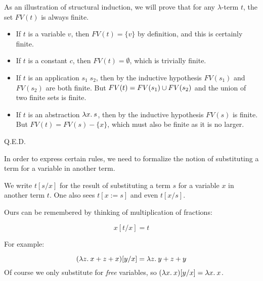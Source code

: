 \begin{slide*}


\vspace*{0.5cm}

As an illustration of structural induction, we will prove that for any
$\lambda$-term {\red $t$}, the set {\red $FV(t)$} is always finite.

\begin{itemize}

\item If {\red $t$} is a variable {\red $v$}, then {\red $FV(t) = \{v\}$} by
definition, and this is certainly finite.

\item If {\red $t$} is a constant {\red $c$}, then {\red $FV(t) = \emptyset$},
which is trivially finite.

\item If {\red $t$} is an application {\red $s_1\; s_2$}, then by the inductive
hypothesis {\red $FV(s_1)$} and {\red $FV(s_2)$} are both finite. But {\red
$FV(t) = FV(s_1) \cup FV(s_2)$} and the union of two finite sets is finite.

\item If {\red $t$} is an abstraction {\red $\lambda x.\: s$}, then by the
inductive hypothesis {\red $FV(s)$} is finite. But {\red $FV(t) = FV(s) -
\{x\}$}, which must also be finite as it is no larger.

\end{itemize}

Q.E.D.

\end{slide*}




\begin{slide*}


\vspace*{0.5cm}

In order to express certain rules, we need to formalize the notion of
substituting a term for a variable in another term.

We write {\red $t[s/x]$} for the result of substituting a term {\red $s$} for a
variable {\red $x$} in another term {\red $t$}. One also sees {\red $t[x :=
s]$} and even {\red $t[x/s]$}.

Ours can be remembered by thinking of multiplication of fractions:

{\red $$ x[t/x] = t $$}

For example:

{\red $$ (\lambda z.\: x + z + x)[y/x] = \lambda z.\: y + z + y $$}
Of course we only substitute for {\em free} variables, so {\red $(\lambda x.\:
x)[y/x] = \lambda x.\: x$}.
\end{slide*}




